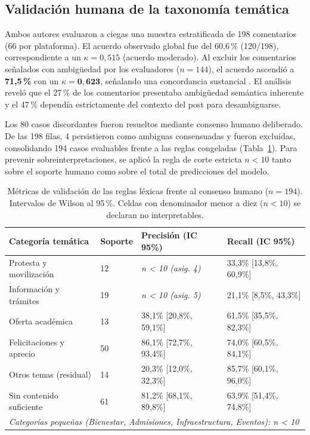 \documentclass[conference]{IEEEtran}
\newcommand{\pc}{\,\%}
\begin{document}
\subsection{Validaci\'on humana de la taxonom\'ia tem\'atica}
Ambos autores evaluaron a ciegas una muestra estratificada de 198 comentarios (66 por plataforma). El acuerdo observado global fue del 60,6\pc{} (120/198), correspondiente a un $\kappa = 0,515$ (acuerdo moderado). Al excluir los comentarios se\~nalados con ambigüedad por los evaluadores ($n = 144$), el acuerdo ascendi\'o a \textbf{71,5\pc} con un $\kappa = \mathbf{0,623}$, se\~nalando una concordancia sustancial \cite{landis1977}. El an\'alisis revel\'o que el 27\pc{} de los comentarios presentaba ambigüedad sem\'antica inherente y el 47\pc{} depend\'ia estrictamente del contexto del post para desambiguarse.

Los 80 casos discordantes fueron resueltos mediante consenso humano deliberado. De las 198 filas, 4 persistieron como ambiguas consensuadas y fueron excluidas, consolidando 194 casos evaluables frente a las reglas congeladas (Tabla~\ref{tab:evaluacion_reglas_tematicas}). Para prevenir sobreinterpretaciones, se aplic\'o la regla de corte estricta $n < 10$ tanto sobre el soporte humano como sobre el total de predicciones del modelo.

\begin{table}[!t]
\centering
\footnotesize
\caption{M\'etricas de validaci\'on de las reglas l\'exicas frente al consenso humano ($n = 194$). Intervalos de Wilson al 95\pc. Celdas con denominador menor a diez ($n < 10$) se declaran no interpretables.}
\label{tab:evaluacion_reglas_tematicas}
\begin{tabular}{@{}p{}p{}p{}p{}@{}}
\toprule
\textbf{Categor\'ia tem\'atica} & \textbf{Soporte} & \textbf{Precisi\'on (IC 95\%)} & \textbf{Recall (IC 95\%)} \\
\midrule
Protesta y movilizaci\'on & 12 & \textit{n < 10 (asig. 4)} & 33,3\% [13,8\%, 60,9\%] \\
Informaci\'on y tr\'amites & 19 & \textit{n < 10 (asig. 5)} & 21,1\% [8,5\%, 43,3\%] \\
Oferta acad\'emica & 13 & 38,1\% [20,8\%, 59,1\%] & 61,5\% [35,5\%, 82,3\%] \\
Felicitaciones y aprecio & 50 & 86,1\% [72,7\%, 93,4\%] & 74,0\% [60,5\%, 84,1\%] \\
\midrule
Otros temas (residual) & 14 & 20,3\% [12,0\%, 32,3\%] & 85,7\% [60,1\%, 96,0\%] \\
Sin contenido suficiente & 61 & 81,2\% [68,1\%, 89,8\%] & 63,9\% [51,4\%, 74,8\%] \\
\midrule
\multicolumn{4}{l}{\textit{Categor\'ias peque\~nas (Bienestar, Admisiones, Infraestructura, Eventos): n < 10}} \\
\bottomrule
\end{tabular}
\end{table}
\end{document}
